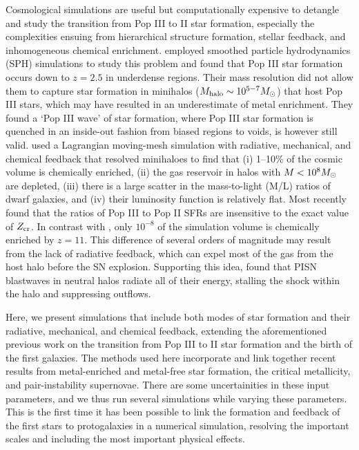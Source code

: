 \documentclass[useAMS,usenatbib]{mn2e}
\begin{document}
Cosmological simulations are useful but computationally expensive to
detangle and study the transition from Pop III to II star formation,
especially the complexities ensuing from hierarchical structure
formation, stellar feedback, and inhomogeneous chemical enrichment.
\citeauthor{Tornatore07} employed smoothed particle hydrodynamics
(SPH) simulations to study this problem and found that Pop III star
formation occurs down to $z=2.5$ in underdense regions.  Their mass
resolution did not allow them to capture star formation in minihalos
($M_{\rm halo} \sim 10^{5-7} \Ms$) that host Pop III stars, which may
have resulted in an underestimate of metal enrichment.  They found a
`Pop III wave' of star formation, where Pop III star formation is
quenched in an inside-out fashion from biased regions to voids, is
however still valid.  \citeauthor{Ricotti08} used a Lagrangian
moving-mesh simulation with radiative, mechanical, and chemical
feedback that resolved minihaloes to find that (i) 1--10\% of the
cosmic volume is chemically enriched, (ii) the gas reservoir in halos
with $M < 10^8 \Ms$ are depleted, (iii) there is a large scatter in
the mass-to-light (M/L) ratios of dwarf galaxies, and (iv) their
luminosity function is relatively flat.  Most recently
\citeauthor{Maio10_Pop32} found that the ratios of Pop III to Pop II
SFRs are insensitive to the exact value of $Z_{\rm cr}$.  In contrast
with \citeauthor{Ricotti08}, only $10^{-8}$ of the simulation volume
is chemically enriched by $z=11$.  This difference of several orders
of magnitude may result from the lack of radiative feedback, which can
expel most of the gas from the host halo before the SN explosion.
Supporting this idea, \citet{Whalen08_SN} found that PISN blastwaves
in neutral halos radiate all of their energy, stalling the shock
within the halo and suppressing outflows.

Here, we present simulations that include both modes of star formation
and their radiative, mechanical, and chemical feedback, extending the
aforementioned previous work on the transition from Pop III to II star
formation and the birth of the first galaxies.  The methods used here
incorporate and link together recent results from metal-enriched and
metal-free star formation, the critical metallicity, and
pair-instability supernovae.  There are some uncertainities in these
input parameters, and we thus run several simulations while varying
these parameters.  This is the first time it has been possible to link
the formation and feedback of the first stars to protogalaxies in a
numerical simulation, resolving the important scales and including the
most important physical effects.
\end{document}
